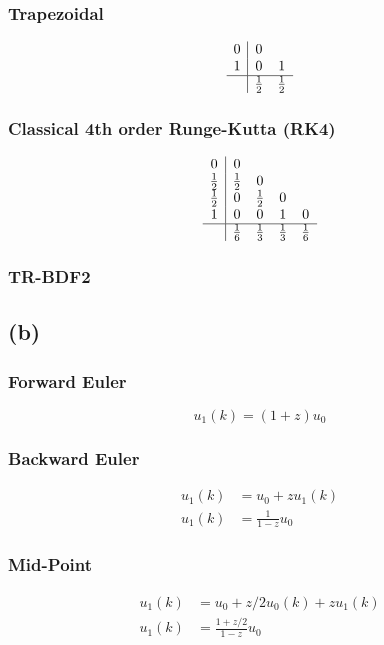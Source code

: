 \documentclass{article}
\begin{document}
\subsubsection*{Trapezoidal}
\begin{equation}
\begin{array}{c|cc}
0 & 0 \\
1 & 0 & 1 \\
\hline
& \frac{1}{2} & \frac{1}{2}
\end{array}
\end{equation}

\subsubsection*{Classical 4th order Runge-Kutta (RK4)}
\begin{equation}
\begin{array}{c|cccc}
0 & 0 \\
\frac{1}{2} & \frac{1}{2} & 0 \\
\frac{1}{2} & 0 & \frac{1}{2} & 0 \\
1 & 0 & 0 & 1 & 0 \\
\hline
& \frac{1}{6} & \frac{1}{3} & \frac{1}{3} & \frac{1}{6}
\end{array}
\end{equation}


\subsubsection*{TR-BDF2}

\subsection*{(b)}
\subsubsection*{Forward Euler}
\begin{equation}
u_1(k)=(1+z)u_0
\end{equation}

\subsubsection*{Backward Euler}
\begin{align}
u_1(k)&=u_0+zu_1(k) \nonumber\\
u_1(k)&=\frac{1}{1-z}u_0
\end{align}

\subsubsection*{Mid-Point}
\begin{align}
u_1(k)&=u_0+z/2u_0(k)+zu_1(k) \nonumber\\
u_1(k)&=\frac{1+z/2}{1-z}u_0
\end{align}
\end{document}
